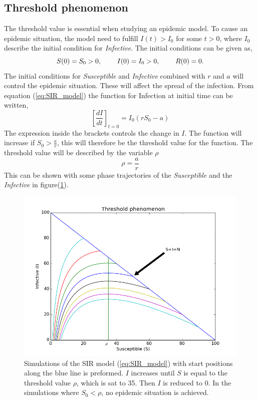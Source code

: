 \documentclass[%
twoside,                 %
final,                   %
10pt]{article}
\begin{document}
\subsection{Threshold phenomenon}
The threshold value is essential when studying an epidemic model. To cause an epidemic situation, the model need to fulfill $I(t)> I_0$ for some $t>0$, where $I_0$ describe the initial condition for \emph{Infective}. The initial conditions can be given as,
\begin{equation}
S(0)=S_0 > 0,\hspace{8mm} I(0)=I_0>0,\hspace{8mm} R(0) =0.
\end{equation}
The initial conditions for \emph{Susceptible} and \emph{Infective} combined with $r$ and $a$ will control the epidemic situation. These will affect the spread of the infection. From equation (\ref{eq:SIR_model}) the function for Infection at initial time can be written,
\begin{equation}
\left[\frac{dI}{dt}\right]_{t=0} = I_0(rS_0-a)
\end{equation}
The expression inside the brackets controls the change in $I$. The function will increase if $S_0 > \frac{a}{r}$, this will therefore be the threshold value for the function. The threshold value will be described by the variable $\rho$
\begin{equation} \label{eq:threshold_value}
\rho = \frac{a}{r}
\end{equation}
This can be shown with some phase trajectories of the \emph{Susceptible} and the \emph{Infective} in figure(\ref{fig:threshold_phenomenon}).  


\begin{figure}[ht]
  \centerline{\includegraphics[width=0.9\linewidth]{plots/threshold_phenomenon.png}}
  \caption{
  \label{fig:threshold_phenomenon} Simulations of the SIR model (\ref{eq:SIR_model}) with start positions along the blue line is preformed. $I$ increases until $S$ is equal to the threshold value $\rho$, which is sat to 35. Then $I$ is reduced to 0. In the simulations where $S_0 < \rho$, no epidemic situation is achieved.
  }
\end{figure}
\end{document}
